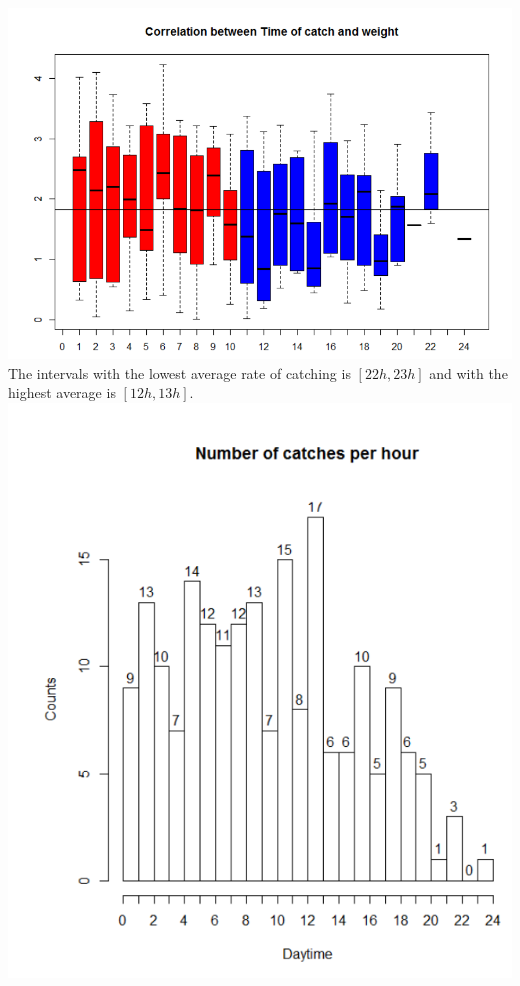 \documentclass[12pt]{article} %
\begin{document}
\includegraphics[scale=.55]{correlation}\\
The intervals with the lowest average rate of catching is $[22h,23h]$ and with the highest average is $[12h,13h]$.\\
\includegraphics[scale=.6]{highest_lowest_intervals}
\newpage
\end{document}
